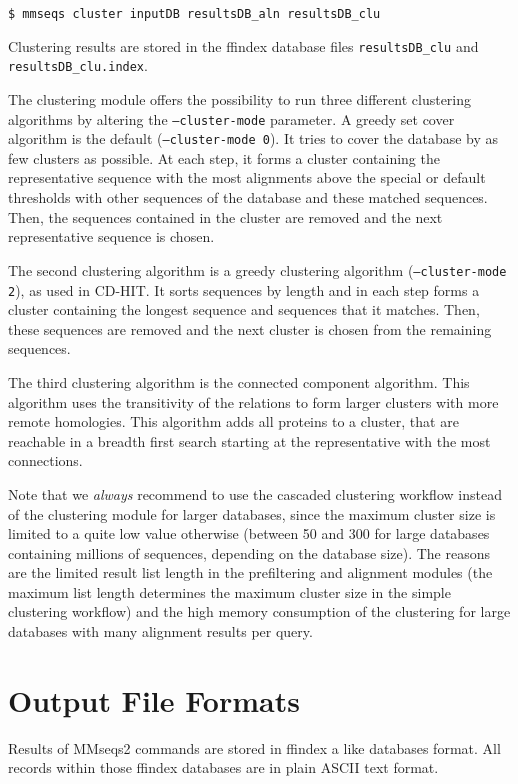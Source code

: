 \documentclass[11pt,a4paper]{scrreprt}
\begin{document}
\begin{verbatim}
$ mmseqs cluster inputDB resultsDB_aln resultsDB_clu
\end{verbatim}

Clustering results are stored in the ffindex database files \texttt{resultsDB\_clu} and \texttt{resultsDB\_clu.index}.

The clustering module offers the possibility to run three different clustering algorithms by altering the \texttt{--cluster-mode} parameter. A greedy set cover algorithm is the default (\texttt{--cluster-mode 0}). It tries to cover the database by as few clusters as possible. At each step, it forms a cluster containing the representative sequence with the most alignments above the special or default thresholds with other sequences of the database and these matched sequences. Then, the sequences contained in the cluster are removed and the next representative sequence is chosen.

The second clustering algorithm is a greedy clustering algorithm (\texttt{--cluster-mode 2}), as used in CD-HIT. It sorts sequences by length and in each step forms a cluster containing the longest sequence and sequences that it matches. Then, these sequences are removed and the next cluster is chosen from the remaining sequences.

The third clustering algorithm is the connected component algorithm. This algorithm uses the transitivity of the relations to form larger clusters with more remote homologies. This algorithm adds all proteins to a cluster, that are reachable in a breadth first search starting at the representative with the most connections.

Note that we \emph{always} recommend to use the cascaded clustering workflow instead of the clustering module for larger databases, since the maximum cluster size is limited to a quite low value otherwise (between 50 and 300 for large databases containing millions of sequences, depending on the database size). The reasons are the limited result list length in the prefiltering and alignment modules (the maximum list length determines the maximum cluster size in the simple clustering workflow) and the high memory consumption of the clustering for large databases with many alignment results per query.

\section{Output File Formats}
Results of MMseqs2 commands are stored in ffindex a like databases format. All records within those ffindex databases are in plain ASCII text format. 
\end{document}
